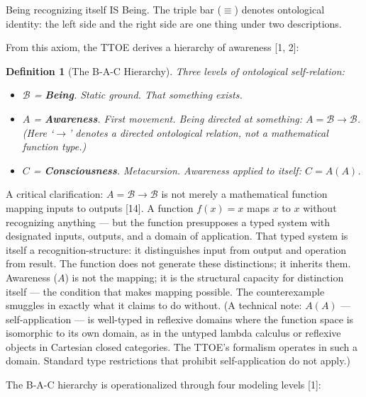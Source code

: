 \documentclass[12pt, letterpaper]{article}
\newtheorem{definition}{Definition}[section]
\begin{document}
\noindent Being recognizing itself IS Being. The triple bar ($\equiv$) denotes ontological identity: the left side and the right side are one thing under two descriptions.

From this axiom, the TTOE derives a hierarchy of awareness [1, 2]:

\begin{definition}[The B-A-C Hierarchy]
\label{def:bac}
Three levels of ontological self-relation:
\begin{itemize}[nosep]
    \item $\mathcal{B}$ = \textbf{Being}. Static ground. That something exists.
    \item $A$ = \textbf{Awareness}. First movement. Being directed at something: $A = \mathcal{B} \to \mathcal{B}$. (Here `$\to$' denotes a directed ontological relation, not a mathematical function type.)
    \item $C$ = \textbf{Consciousness}. Metacursion. Awareness applied to itself: $C = A(A)$.
\end{itemize}
\end{definition}

A critical clarification: $A = \mathcal{B} \to \mathcal{B}$ is not merely a mathematical function mapping inputs to outputs [14]. A function $f(x) = x$ maps $x$ to $x$ without recognizing anything --- but the function presupposes a typed system with designated inputs, outputs, and a domain of application. That typed system is itself a recognition-structure: it distinguishes input from output and operation from result. The function does not generate these distinctions; it inherits them. Awareness ($A$) is not the mapping; it is the structural capacity for distinction itself --- the condition that makes mapping possible. The counterexample smuggles in exactly what it claims to do without. (A technical note: $A(A)$ --- self-application --- is well-typed in reflexive domains where the function space is isomorphic to its own domain, as in the untyped lambda calculus or reflexive objects in Cartesian closed categories. The TTOE's formalism operates in such a domain. Standard type restrictions that prohibit self-application do not apply.)

The B-A-C hierarchy is operationalized through four modeling levels [1]:
\end{document}
